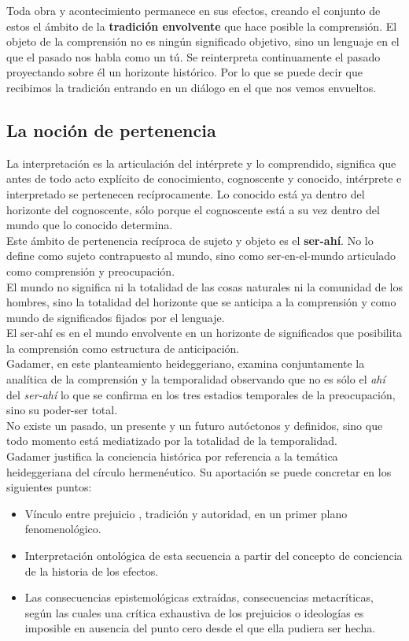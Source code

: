 \documentclass[a4paper, 11pt, twocolumn, spanish]{article}
\begin{document}
Toda obra y acontecimiento permanece en sus efectos, creando el
conjunto de estos el ámbito de la \textbf{tradición envolvente} que hace
posible la comprensión. El objeto de la comprensión no es ningún
significado objetivo, sino un lenguaje en el que el pasado nos habla
como un tú. Se reinterpreta continuamente el pasado proyectando sobre
él un horizonte histórico. Por lo que se puede decir que recibimos la
tradición entrando en un diálogo en el que nos vemos envueltos.

\subsection{La noción de pertenencia}
\label{sec:org8a25814}
La interpretación es la articulación del intérprete y lo comprendido,
significa que antes de todo acto explícito de conocimiento,
cognoscente y conocido, intérprete e interpretado se pertenecen
recíprocamente. Lo conocido está ya dentro del horizonte del
cognoscente, sólo porque el cognoscente está a su vez dentro del mundo
que lo conocido determina.\\[0pt]

Este ámbito de pertenencia recíproca de sujeto y objeto es el
\textbf{ser-ahí}. No lo define como sujeto contrapuesto al mundo, sino como
ser-en-el-mundo articulado como comprensión y preocupación.\\[0pt]
El mundo no significa ni la totalidad de las cosas naturales ni la
comunidad de los hombres, sino la totalidad del horizonte que se
anticipa a la comprensión y como mundo de significados fijados por el
lenguaje.\\[0pt]
El ser-ahí es en el mundo envolvente en un horizonte de significados
que posibilita la comprensión como estructura de anticipación.\\[0pt]
Gadamer, en este planteamiento heideggeriano, examina conjuntamente la
analítica de la comprensión y la temporalidad observando que no es
sólo el \emph{ahí} del \emph{ser-ahí} lo que se confirma en los tres estadios
temporales de la preocupación, sino su poder-ser total.\\[0pt]

No existe un pasado, un presente y un futuro autóctonos y definidos,
sino que todo momento está mediatizado por la totalidad de la
temporalidad.\\[0pt]
Gadamer justifica la conciencia histórica por referencia a la temática
heideggeriana del círculo hermenéutico. Su aportación se puede
concretar en los siguientes puntos:
\begin{itemize}
\item Vínculo entre prejuicio , tradición y autoridad, en un primer
plano fenomenológico.
\item Interpretación ontológica de esta secuencia a partir del concepto
de conciencia de la historia de los efectos.
\item Las consecuencias epistemológicas extraídas, consecuencias
metacríticas, según las cuales una crítica exhaustiva de los
prejuicios o ideologías es imposible en ausencia del punto cero
desde el que ella pudiera ser hecha.
\end{itemize}
\end{document}
